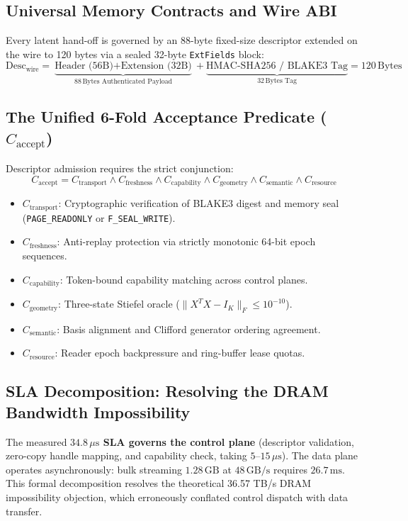 \documentclass[journal,10pt,compsoc]{IEEEtran}
\theoremstyle{plain}
\theoremstyle{definition}
\begin{document}
\subsection{Universal Memory Contracts and Wire ABI}
Every latent hand-off is governed by an 88-byte fixed-size descriptor extended on the wire to 120 bytes via a sealed 32-byte \texttt{ExtFields} block:
\begin{equation}
\label{eq:descriptor_wire}
\text{Desc}_{\text{wire}} = \underbrace{\text{Header (56B)} + \text{Extension (32B)}}_{88\,\text{Bytes Authenticated Payload}} + \underbrace{\text{HMAC-SHA256 / BLAKE3 Tag}}_{32\,\text{Bytes Tag}} = 120\,\text{Bytes}
\end{equation}

\subsection{The Unified 6-Fold Acceptance Predicate ($C_{\text{accept}}$)}
Descriptor admission requires the strict conjunction:
\begin{equation}
\label{eq:caccept}
C_{\text{accept}} = C_{\text{transport}} \land C_{\text{freshness}} \land C_{\text{capability}} \land C_{\text{geometry}} \land C_{\text{semantic}} \land C_{\text{resource}}
\end{equation}
\begin{itemize}
    \item $C_{\text{transport}}$: Cryptographic verification of BLAKE3 digest and memory seal (\texttt{PAGE\_READONLY} or \texttt{F\_SEAL\_WRITE}).
    \item $C_{\text{freshness}}$: Anti-replay protection via strictly monotonic 64-bit epoch sequences.
    \item $C_{\text{capability}}$: Token-bound capability matching across control planes.
    \item $C_{\text{geometry}}$: Three-state Stiefel oracle ($\|X^T X - I_K\|_F \le 10^{-10}$).
    \item $C_{\text{semantic}}$: Basis alignment and Clifford generator ordering agreement.
    \item $C_{\text{resource}}$: Reader epoch backpressure and ring-buffer lease quotas.
\end{itemize}

\subsection{SLA Decomposition: Resolving the DRAM Bandwidth Impossibility}
The measured \textbf{$34.8\,\mu\text{s}$ SLA governs the control plane} (descriptor validation, zero-copy handle mapping, and capability check, taking $5\text{--}15\,\mu\text{s}$). The data plane operates asynchronously: bulk streaming $1.28\,\text{GB}$ at $48\,\text{GB/s}$ requires $26.7\,\text{ms}$. This formal decomposition resolves the theoretical 36.57 TB/s DRAM impossibility objection, which erroneously conflated control dispatch with data transfer.
\end{document}

